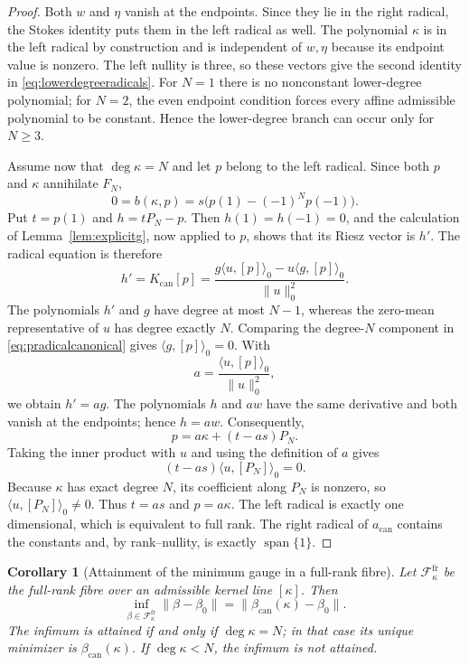 \documentclass[11pt,a4paper]{article}
\newtheorem{corollary}[theorem]{Corollary}
\theoremstyle{definition}
\theoremstyle{remark}
\newcommand{\spanof}{\operatorname{span}}
\begin{document}
\begin{proof}
Both $w$ and $\eta$ vanish at the endpoints.  Since they lie in the right radical, the
Stokes identity puts them in the left radical as well.  The polynomial $\kappa$ is in the
left radical by construction and is independent of $w,\eta$ because its endpoint value is
nonzero.  The left nullity is three, so these vectors give the second identity in
\eqref{eq:lowerdegreeradicals}.  For $N=1$ there is no nonconstant lower-degree polynomial;
for $N=2$, the even endpoint condition forces every affine admissible polynomial to be
constant.  Hence the lower-degree branch can occur only for $N\geq3$.

Assume now that $\deg\kappa=N$ and let $p$ belong to the left radical.  Since both $p$ and
$\kappa$ annihilate $F_N$,
\[
 0=b(\kappa,p)
 =s\bigl(p(1)-(-1)^Np(-1)\bigr).
\]
Put $t=p(1)$ and $h=tP_N-p$.  Then $h(1)=h(-1)=0$, and the calculation of
Lemma~\ref{lem:explicitg}, now applied to $p$, shows that its Riesz vector is $h'$.  The
radical equation is therefore
\begin{equation}\label{eq:pradicalcanonical}
 h'=K_{\mathrm{can}}[p]
 =\frac{g\langle u,[p]\rangle_0-u\langle g,[p]\rangle_0}{\|u\|_0^2}.
\end{equation}
The polynomials $h'$ and $g$ have degree at most $N-1$, whereas the zero-mean representative
of $u$ has degree exactly $N$.  Comparing the degree-$N$ component in
\eqref{eq:pradicalcanonical} gives
$\langle g,[p]\rangle_0=0$.  With
\[
 a=\frac{\langle u,[p]\rangle_0}{\|u\|_0^2},
\]
we obtain $h'=ag$.  The polynomials $h$ and $aw$ have the same derivative and both vanish at
the endpoints; hence $h=aw$.  Consequently,
\begin{equation}\label{eq:pdecompositioncanonical}
 p=a\kappa+(t-as)P_N.
\end{equation}
Taking the inner product with $u$ and using the definition of $a$ gives
\[
 (t-as)\langle u,[P_N]\rangle_0=0.
\]
Because $\kappa$ has exact degree $N$, its coefficient along $P_N$ is nonzero, so
$\langle u,[P_N]\rangle_0\neq0$.  Thus $t=as$ and $p=a\kappa$.  The left radical is exactly
one dimensional, which is equivalent to full rank.  The right radical of
$a_{\mathrm{can}}$ contains the constants and, by rank--nullity, is exactly
$\spanof\{1\}$.
\end{proof}

\begin{corollary}[Attainment of the minimum gauge in a full-rank fibre]
\label{cor:fullrankminimum}
Let $\mathcal F_\kappa^{\mathrm{fr}}$ be the full-rank fibre over an admissible kernel line
$[\kappa]$.  Then
\begin{equation}\label{eq:fullrankminimum}
 \inf_{\beta\in\mathcal F_\kappa^{\mathrm{fr}}}
 \|\beta-\beta_0\|
 =\|\beta_{\mathrm{can}}(\kappa)-\beta_0\|.
\end{equation}
The infimum is attained if and only if $\deg\kappa=N$; in that case its unique minimizer is
$\beta_{\mathrm{can}}(\kappa)$.  If $\deg\kappa<N$, the infimum is not attained.
\end{corollary}
\end{document}
